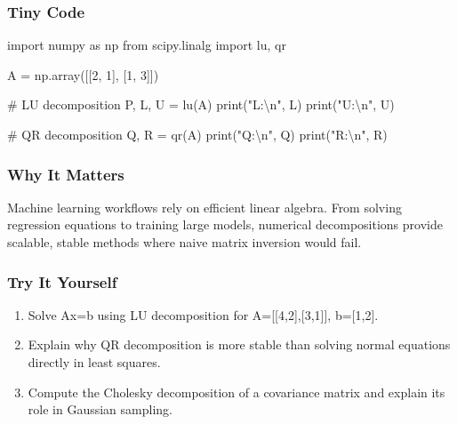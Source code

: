 \documentclass[
  letterpaper,
  DIV=11,
  numbers=noendperiod]{scrreprt}
\newenvironment{Shaded}{\begin{snugshade}}{\end{snugshade}}
\newcommand{\BuiltInTok}[1]{\textcolor[rgb]{0.00,0.23,0.31}{#1}}
\newcommand{\CharTok}[1]{\textcolor[rgb]{0.13,0.47,0.30}{#1}}
\newcommand{\CommentTok}[1]{\textcolor[rgb]{0.37,0.37,0.37}{#1}}
\newcommand{\DecValTok}[1]{\textcolor[rgb]{0.68,0.00,0.00}{#1}}
\newcommand{\ImportTok}[1]{\textcolor[rgb]{0.00,0.46,0.62}{#1}}
\newcommand{\NormalTok}[1]{\textcolor[rgb]{0.00,0.23,0.31}{#1}}
\newcommand{\OperatorTok}[1]{\textcolor[rgb]{0.37,0.37,0.37}{#1}}
\newcommand{\StringTok}[1]{\textcolor[rgb]{0.13,0.47,0.30}{#1}}
\providecommand{\tightlist}{%
  \setlength{\itemsep}{0pt}\setlength{\parskip}{0pt}}
\begin{document}
\subsubsection{Tiny Code}\label{tiny-code-152}

\begin{Shaded}
\begin{Highlighting}[]
\ImportTok{import}\NormalTok{ numpy }\ImportTok{as}\NormalTok{ np}
\ImportTok{from}\NormalTok{ scipy.linalg }\ImportTok{import}\NormalTok{ lu, qr}

\NormalTok{A }\OperatorTok{=}\NormalTok{ np.array([[}\DecValTok{2}\NormalTok{, }\DecValTok{1}\NormalTok{], [}\DecValTok{1}\NormalTok{, }\DecValTok{3}\NormalTok{]])}

\CommentTok{\# LU decomposition}
\NormalTok{P, L, U }\OperatorTok{=}\NormalTok{ lu(A)}
\BuiltInTok{print}\NormalTok{(}\StringTok{"L:}\CharTok{\textbackslash{}n}\StringTok{"}\NormalTok{, L)}
\BuiltInTok{print}\NormalTok{(}\StringTok{"U:}\CharTok{\textbackslash{}n}\StringTok{"}\NormalTok{, U)}

\CommentTok{\# QR decomposition}
\NormalTok{Q, R }\OperatorTok{=}\NormalTok{ qr(A)}
\BuiltInTok{print}\NormalTok{(}\StringTok{"Q:}\CharTok{\textbackslash{}n}\StringTok{"}\NormalTok{, Q)}
\BuiltInTok{print}\NormalTok{(}\StringTok{"R:}\CharTok{\textbackslash{}n}\StringTok{"}\NormalTok{, R)}
\end{Highlighting}
\end{Shaded}

\subsubsection{Why It Matters}\label{why-it-matters-50}

Machine learning workflows rely on efficient linear algebra. From
solving regression equations to training large models, numerical
decompositions provide scalable, stable methods where naive matrix
inversion would fail.

\subsubsection{Try It Yourself}\label{try-it-yourself-152}

\begin{enumerate}
\def\labelenumi{\arabic{enumi}.}
\tightlist
\item
  Solve Ax=b using LU decomposition for A={[}{[}4,2{]},{[}3,1{]}{]},
  b={[}1,2{]}.
\item
  Explain why QR decomposition is more stable than solving normal
  equations directly in least squares.
\item
  Compute the Cholesky decomposition of a covariance matrix and explain
  its role in Gaussian sampling.
\end{enumerate}
\end{document}
